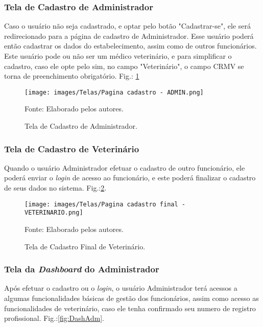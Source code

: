 \documentclass[
    12pt,               %
    openright,          %
    oneside,
    a4paper,            %
    BIBLATEX,           %
    TODO,               %
    english,            %
    brazil              %
    ]{ifsp-spo-inf-ctds}
\begin{document}
\subsubsection{Tela de Cadastro de Administrador}

Caso o usuário não seja cadastrado, e optar pelo botão "Cadastrar-se", ele será redirecionado para a página de cadastro de Administrador. Esse usuário poderá então cadastrar os dados do estabelecimento, assim como de outros funcionários. Este usuário pode ou não ser um médico veterinário, e para simplificar o cadastro, caso ele opte pelo sim, no campo "Veterinário", o campo CRMV se torna de preenchimento obrigatório. Fig.: \ref{fig:CadAdmin}

\begin{figure}[H]
                \centering
                \caption{Tela de Cadastro de Administrador.}
                \texttt{[image: images/Telas/Pagina cadastro - ADMIN.png]}
                
                \label{fig:CadAdmin}
                \centering
        {\footnotesize Fonte: Elaborado pelos autores.}
            \end{figure}




\subsubsection{Tela de Cadastro de Veterinário}
Quando o usuário Administrador efetuar o cadastro de outro funcionário, ele poderá enviar o \emph{login} de acesso ao funcionário, e este poderá finalizar o cadastro de seus dados no sistema. Fig.:\ref{fig:CadVet}.  

            \begin{figure}[H]
                \centering
                \caption{Tela de Cadastro Final de Veterinário.}
                \texttt{[image: images/Telas/Pagina cadastro final - VETERINARIO.png]}
                
                \label{fig:CadVet}
                \centering
        {\footnotesize Fonte: Elaborado pelos autores.}
            \end{figure}


\subsubsection{Tela da \emph{Dashboard} do Administrador}

Após efetuar o cadastro ou o \emph{login}, o usuário Administrador terá acessos a algumas funcionalidades básicas de gestão dos funcionários, assim como acesso as funcionalidades de veterinário, caso ele tenha confirmado seu numero de registro profissional. Fig.:\ref{fig:DashAdm}.
\end{document}
